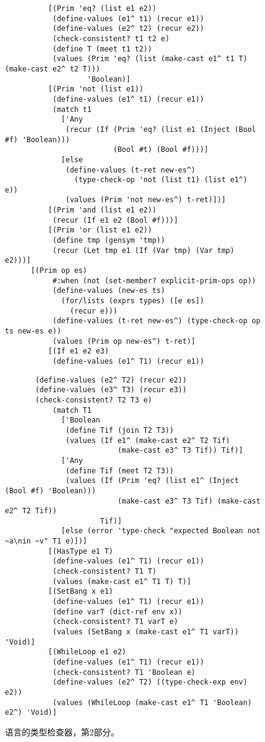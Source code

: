 \documentclass[11pt]{book}
\begin{document}
\begin{figure}[tbp]
\begin{lstlisting}
          [(Prim 'eq? (list e1 e2))
           (define-values (e1^ t1) (recur e1))
           (define-values (e2^ t2) (recur e2))
           (check-consistent? t1 t2 e)
           (define T (meet t1 t2))
           (values (Prim 'eq? (list (make-cast e1^ t1 T) (make-cast e2^ t2 T)))
                   'Boolean)]
          [(Prim 'not (list e1))
           (define-values (e1^ t1) (recur e1))
           (match t1
             ['Any
              (recur (If (Prim 'eq? (list e1 (Inject (Bool #f) 'Boolean)))
                         (Bool #t) (Bool #f)))]
             [else
              (define-values (t-ret new-es^)
                (type-check-op 'not (list t1) (list e1^) e))
              (values (Prim 'not new-es^) t-ret)])]
          [(Prim 'and (list e1 e2))
           (recur (If e1 e2 (Bool #f)))]
          [(Prim 'or (list e1 e2))
           (define tmp (gensym 'tmp))
           (recur (Let tmp e1 (If (Var tmp) (Var tmp) e2)))]
	  [(Prim op es)
           #:when (not (set-member? explicit-prim-ops op))
           (define-values (new-es ts)
             (for/lists (exprs types) ([e es])
               (recur e)))
           (define-values (t-ret new-es^) (type-check-op op ts new-es e))
           (values (Prim op new-es^) t-ret)]
          [(If e1 e2 e3)
           (define-values (e1^ T1) (recur e1))
\end{lstlisting}
\end{figure}
\begin{figure}[tbp]
\begin{lstlisting}           
	   (define-values (e2^ T2) (recur e2))
	   (define-values (e3^ T3) (recur e3))
	   (check-consistent? T2 T3 e)
           (match T1
             ['Boolean
              (define Tif (join T2 T3))
              (values (If e1^ (make-cast e2^ T2 Tif)
                          (make-cast e3^ T3 Tif)) Tif)]
             ['Any
              (define Tif (meet T2 T3))
              (values (If (Prim 'eq? (list e1^ (Inject (Bool #f) 'Boolean)))
                          (make-cast e3^ T3 Tif) (make-cast e2^ T2 Tif))
                      Tif)]
             [else (error 'type-check "expected Boolean not ~a\nin ~v" T1 e)])]
          [(HasType e1 T)
           (define-values (e1^ T1) (recur e1))
           (check-consistent? T1 T)
           (values (make-cast e1^ T1 T) T)]          
          [(SetBang x e1)
           (define-values (e1^ T1) (recur e1))
           (define varT (dict-ref env x))
           (check-consistent? T1 varT e)
           (values (SetBang x (make-cast e1^ T1 varT)) 'Void)]
          [(WhileLoop e1 e2)
           (define-values (e1^ T1) (recur e1))
           (check-consistent? T1 'Boolean e)
           (define-values (e2^ T2) ((type-check-exp env) e2))
           (values (WhileLoop (make-cast e1^ T1 'Boolean) e2^) 'Void)]
\end{lstlisting}
\caption{ \LangGrad{} 语言的类型检查器，第2部分。}
\label{fig:type-check-Rgradual-2}
\end{figure}
\end{document}
